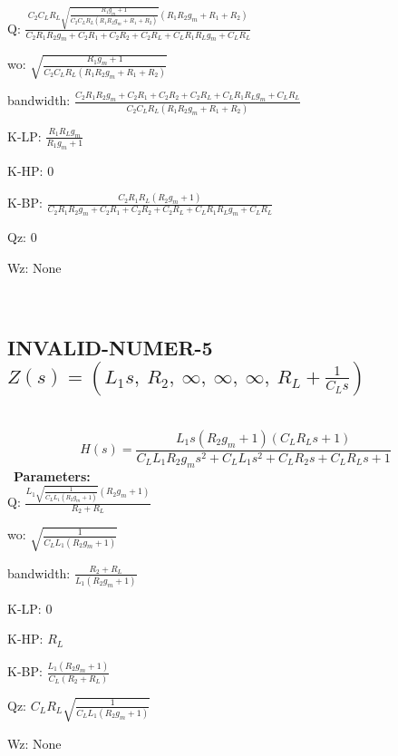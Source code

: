 \documentclass{article}
\begin{document}
Q: $\frac{C_{2} C_{L} R_{L} \sqrt{\frac{R_{1} g_{m} + 1}{C_{2} C_{L} R_{L} \left(R_{1} R_{2} g_{m} + R_{1} + R_{2}\right)}} \left(R_{1} R_{2} g_{m} + R_{1} + R_{2}\right)}{C_{2} R_{1} R_{2} g_{m} + C_{2} R_{1} + C_{2} R_{2} + C_{2} R_{L} + C_{L} R_{1} R_{L} g_{m} + C_{L} R_{L}}$\ 

wo: $\sqrt{\frac{R_{1} g_{m} + 1}{C_{2} C_{L} R_{L} \left(R_{1} R_{2} g_{m} + R_{1} + R_{2}\right)}}$\ 

bandwidth: $\frac{C_{2} R_{1} R_{2} g_{m} + C_{2} R_{1} + C_{2} R_{2} + C_{2} R_{L} + C_{L} R_{1} R_{L} g_{m} + C_{L} R_{L}}{C_{2} C_{L} R_{L} \left(R_{1} R_{2} g_{m} + R_{1} + R_{2}\right)}$\ 

K-LP: $\frac{R_{1} R_{L} g_{m}}{R_{1} g_{m} + 1}$\ 

K-HP: $0$\ 

K-BP: $\frac{C_{2} R_{1} R_{L} \left(R_{2} g_{m} + 1\right)}{C_{2} R_{1} R_{2} g_{m} + C_{2} R_{1} + C_{2} R_{2} + C_{2} R_{L} + C_{L} R_{1} R_{L} g_{m} + C_{L} R_{L}}$\ 

Qz: $0$\ 

Wz: $\text{None}$\ 

\ 

\subsection{INVALID-NUMER-5 $Z(s) = \left( L_{1} s, \  R_{2}, \  \infty, \  \infty, \  \infty, \  R_{L} + \frac{1}{C_{L} s}\right)$ } \ 
\textbf{\[H(s) = \frac{L_{1} s \left(R_{2} g_{m} + 1\right) \left(C_{L} R_{L} s + 1\right)}{C_{L} L_{1} R_{2} g_{m} s^{2} + C_{L} L_{1} s^{2} + C_{L} R_{2} s + C_{L} R_{L} s + 1}\] } \ 
\textbf{Parameters:}\\ 

Q: $\frac{L_{1} \sqrt{\frac{1}{C_{L} L_{1} \left(R_{2} g_{m} + 1\right)}} \left(R_{2} g_{m} + 1\right)}{R_{2} + R_{L}}$\ 

wo: $\sqrt{\frac{1}{C_{L} L_{1} \left(R_{2} g_{m} + 1\right)}}$\ 

bandwidth: $\frac{R_{2} + R_{L}}{L_{1} \left(R_{2} g_{m} + 1\right)}$\ 

K-LP: $0$\ 

K-HP: $R_{L}$\ 

K-BP: $\frac{L_{1} \left(R_{2} g_{m} + 1\right)}{C_{L} \left(R_{2} + R_{L}\right)}$\ 

Qz: $C_{L} R_{L} \sqrt{\frac{1}{C_{L} L_{1} \left(R_{2} g_{m} + 1\right)}}$\ 

Wz: $\text{None}$\ 
\end{document}
